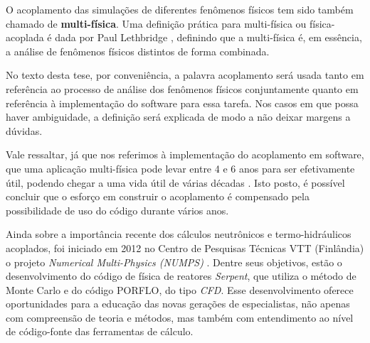 O acoplamento das simulações de diferentes fenômenos físicos tem sido também chamado de
\textbf{multi-física}. 
Uma definição prática para multi-física ou física-acoplada é dada por Paul Lethbridge \cite{Lethbridge2005}, definindo que 
a multi-física é, em essência, a análise de fenômenos físicos distintos de forma combinada.

No texto desta tese, 
por conveniência, a palavra acoplamento será usada tanto em referência ao processo de análise dos fenômenos físicos conjuntamente 
quanto em referência à implementação do software para essa tarefa. Nos casos em que possa haver ambiguidade, 
a definição será explicada de modo a não deixar margens a dúvidas.

Vale ressaltar, já que nos referimos à implementação do acoplamento em software, que uma aplicação multi-física 
pode levar entre 4 e 6 anos para ser efetivamente útil, podendo chegar a uma vida útil de várias décadas 
\cite{Graham2004}. Isto posto, é possível concluir que o esforço em construir o acoplamento é compensado 
pela possibilidade de uso do código durante vários anos.

Ainda sobre a importância recente dos cálculos neutrônicos e termo-hidráulicos acoplados, foi iniciado em 2012
no Centro de Pesquisas Técnicas VTT (Finlândia) o projeto \textit{Numerical Multi-Physics (NUMPS)} \cite{Leppanen2015}.
Dentre seus objetivos, estão o desenvolvimento do código de física de reatores \textit{Serpent}, que utiliza o método de
Monte Carlo e do código PORFLO, do tipo \textit{CFD}. Esse desenvolvimento oferece oportunidades para a educação das novas
gerações de especialistas, não apenas com compreensão de teoria e métodos, mas também com entendimento ao nível de
código-fonte das ferramentas de cálculo.

